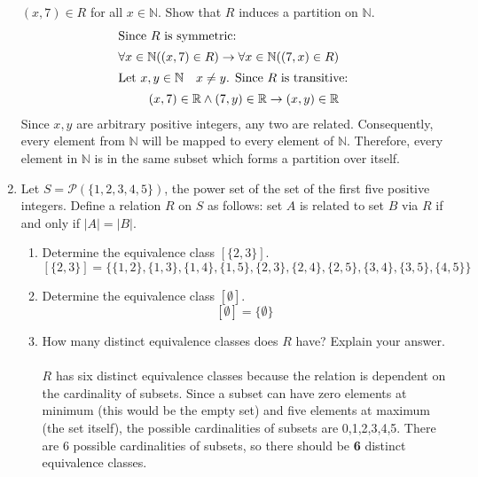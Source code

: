 \documentclass[letterpaper, 12pt]{article}
\newcommand{\then}{\rightarrow}
\newcommand{\N}{\mathbb{N}}
\newcommand{\R}{\mathbb{R}}
\newcommand{\0}{\emptyset}
\newcommand{\power}{\mathcal{P}}
\begin{document}
\begin{enumerate}
$(x,7) \in R$ for all $x \in \N$. Show that $R$ induces a partition on $\N$.
\begin{align*}
    \intertext{Since $R$ is symmetric:}
    \forall x \in \N ((x,7) \in R) \then \forall x \in \N ((7, x) \in R) \\
    \intertext{Let $x, y \in \N \quad x \ne y$. Since $R$ is transitive:}
    (x, 7) \in \R \wedge (7, y) \in \R \then (x, y) \in \R
\end{align*}
Since $x, y$ are arbitrary positive integers, any two are related. 
Consequently, every element from $\N$ will be mapped to every element of $\N$. Therefore, every 
element in $\N$ is in the same subset which forms a partition over itself.
\item Let $S = \power(\{1,2,3,4,5\})$, the power set of the set of the first five positive 
integers. Define a relation $R$ on $S$ as follows: set $A$ is related to set $B$ via $R$ if and 
only if $|A|=|B|$.
\begin{enumerate}
\item Determine the equivalence class $[\{2,3\}]$.
\[[\{2,3\}] = \{\{1,2\},\{1,3\},\{1,4\},\{1,5\},\{2,3\},\{2,4\},\{2,5\},\{3,4\},\{3,5\},\{4,5\}\}\]
\item Determine the equivalence class $[\emptyset]$.
\[[\emptyset] = \{\emptyset\}\]
\item How many distinct equivalence classes does $R$ have? Explain your answer. \\
\\
$R$ has six distinct equivalence classes because the relation is dependent on the cardinality 
of subsets. Since a subset can have zero elements at minimum (this would be the empty 
set) and five elements at maximum (the set itself), the possible cardinalities of subsets are 
0,1,2,3,4,5. There are 6 possible cardinalities of subsets, so there should be \textbf{6} 
distinct equivalence classes.
\end{enumerate}
\end{enumerate}
\end{document}
